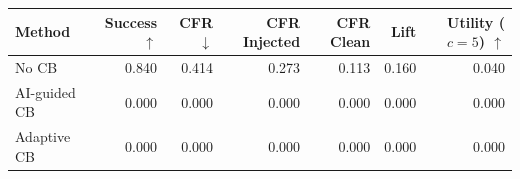 \begin{tabular}{lrrrrrr}
\toprule
Method & Success $\uparrow$ & CFR $\downarrow$ & CFR Injected & CFR Clean & Lift & Utility ($c=5$) $\uparrow$ \\
\midrule
No CB & 0.840 & 0.414 & 0.273 & 0.113 & 0.160 & 0.040 \\
AI-guided CB & 0.000 & 0.000 & 0.000 & 0.000 & 0.000 & 0.000 \\
Adaptive CB & 0.000 & 0.000 & 0.000 & 0.000 & 0.000 & 0.000 \\
\bottomrule
\end{tabular}
